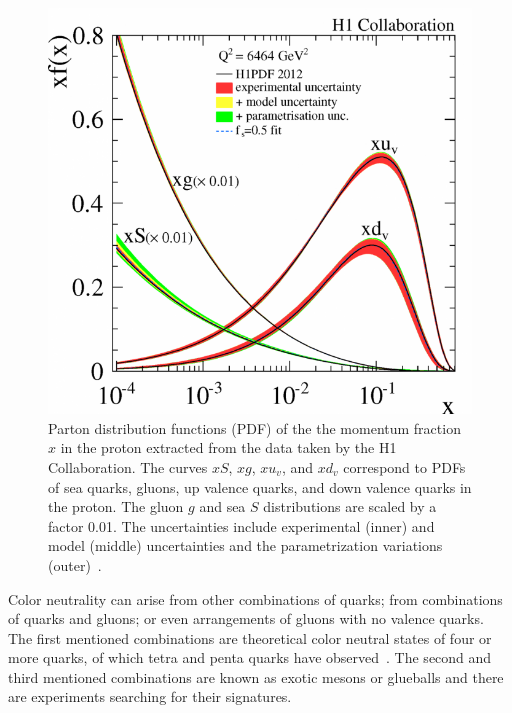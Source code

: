 \begin{figure}[!ht]
\centering
\includegraphics[width=0.45\linewidth]{figs/parton_distribution.png}
\caption{Parton distribution functions (PDF) of the the momentum fraction $x$ in the proton extracted from the data taken by the H1 Collaboration. The curves $xS$, $xg$, $xu_v$, and $xd_v$ correspond to PDFs of sea quarks, gluons, up valence quarks, and down valence quarks in the proton. The gluon $g$ and sea $S$ distributions are scaled by a factor 0.01. The uncertainties include experimental (inner) and model (middle) uncertainties and the parametrization variations (outer)~\cite{Aaron2012}.}
\label{fig:pdf_plot_ch1}
\end{figure}

Color neutrality can arise from other combinations of quarks; from combinations of quarks and gluons; or even arrangements of gluons with no valence quarks. The first mentioned combinations are theoretical color neutral states of four or more quarks, of which tetra and penta quarks have observed~\cite{Aaij:2015tga}. The second and third mentioned combinations are known as exotic mesons or glueballs and there are experiments searching for their signatures.

